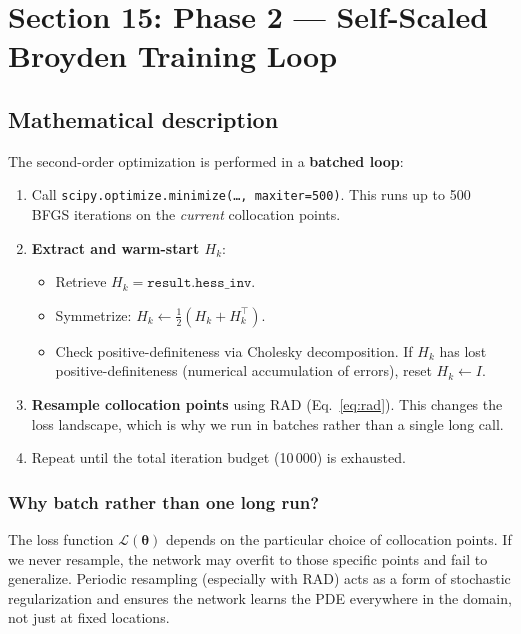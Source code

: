 \documentclass[11pt,a4paper]{article}
\begin{document}
\section{Section 15: Phase 2 --- Self-Scaled Broyden Training Loop}
\label{sec:bfgs_loop}

\subsection*{Mathematical description}

The second-order optimization is performed in a \textbf{batched loop}:

\begin{enumerate}
  \item Call \texttt{scipy.optimize.minimize(\ldots, maxiter=500)}.
        This runs up to 500 BFGS iterations on the \emph{current}
        collocation points.
  \item \textbf{Extract and warm-start $H_k$}:
        \begin{itemize}[nosep]
          \item Retrieve $H_k = \texttt{result.hess\_inv}$.
          \item Symmetrize: $H_k \leftarrow \frac{1}{2}(H_k + H_k^\top)$.
          \item Check positive-definiteness via Cholesky decomposition.
                If $H_k$ has lost positive-definiteness (numerical
                accumulation of errors), reset $H_k \leftarrow I$.
        \end{itemize}
  \item \textbf{Resample collocation points} using RAD
        (Eq.~\eqref{eq:rad}).  This changes the loss landscape, which is
        why we run in batches rather than a single long call.
  \item Repeat until the total iteration budget (10\,000) is exhausted.
\end{enumerate}

\subsubsection*{Why batch rather than one long run?}

The loss function $\mathcal{L}(\bm\theta)$ depends on the particular
choice of collocation points.  If we never resample, the network may
overfit to those specific points  and fail to generalize.  Periodic
resampling (especially with RAD) acts as a form of stochastic
regularization and ensures the network learns the PDE everywhere in
the domain, not just at fixed locations.
\end{document}
